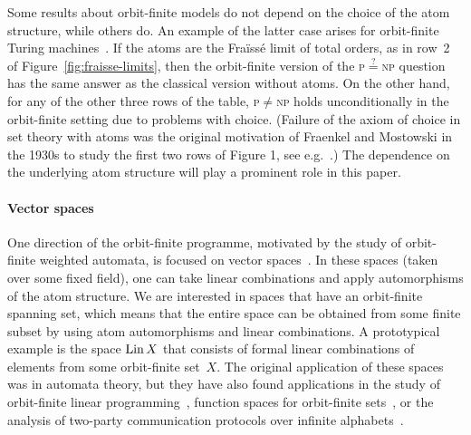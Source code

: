Some results about orbit-finite models do not depend on the choice of the atom structure, while others do. 
An example of the latter case arises for orbit-finite Turing machines~\cite{bojanczykTuringMachinesAtoms2013}. 
If the atoms are the Fraïssé limit of total orders, as in row~2 of Figure~\ref{fig:fraisse-limits}, then the orbit-finite version of the \textsc{p}$\stackrel{?}{=}$\textsc{np} question has the same answer as the classical version without atoms. 
On the other hand, for any of the other three rows of the table, \textsc{p}$\neq$\textsc{np} holds unconditionally in the orbit-finite setting due to problems with choice. 
(Failure of the axiom of choice in set theory with atoms was the original motivation of Fraenkel and Mostowski in the 1930s to study the first two rows of Figure 1, see e.g.~\cite[Ch.~4]{Jech}.)
The dependence on the underlying atom structure will play a prominent role in this paper. 

\paragraph*{Vector spaces}
One direction of the orbit-finite programme, motivated by the study of orbit-finite weighted automata, is focused on vector spaces~\cite{BFKM24}. 
In these spaces (taken over some fixed field), one can take linear combinations and apply automorphisms of the atom structure. 
We are interested in spaces that have an orbit-finite spanning set, which means that the entire space can be obtained from some finite subset by using atom automorphisms and linear combinations.
A prototypical example is the space $\operatorname{Lin} X$ that consists of formal linear combinations of elements from some orbit-finite set~$X$. 
The original application of these spaces was in automata theory, but they have also found applications in the study of  orbit-finite linear programming~\cite{ghosh2023orbit}, function spaces for orbit-finite sets~\cite{functionSpaces2024}, or  the analysis of two-party communication protocols over infinite alphabets~\cite{aliceBob}.

